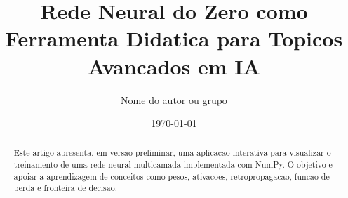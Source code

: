 \documentclass[12pt]{article}
\title{Rede Neural do Zero como Ferramenta Didatica para Topicos Avancados em IA}
\author{Nome do autor ou grupo}
\date{\today}
\begin{document}
\maketitle

\begin{abstract}
Este artigo apresenta, em versao preliminar, uma aplicacao interativa para
visualizar o treinamento de uma rede neural multicamada implementada com NumPy.
O objetivo e apoiar a aprendizagem de conceitos como pesos, ativacoes,
retropropagacao, funcao de perda e fronteira de decisao.
\end{abstract}









\end{document}
